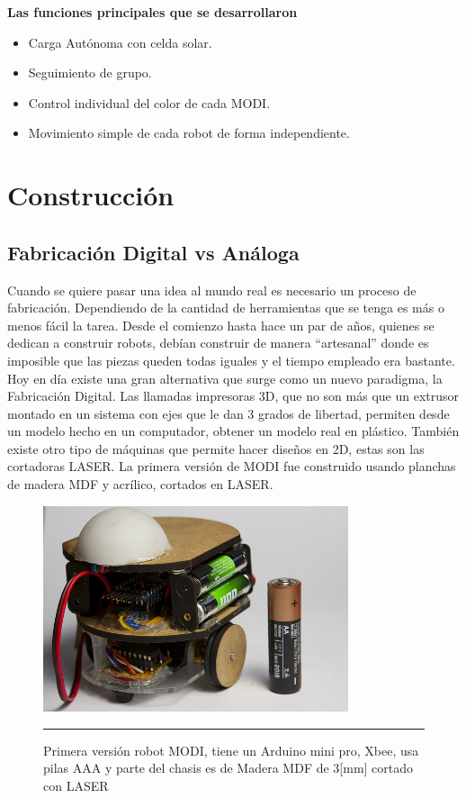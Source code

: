 \textbf{Las funciones principales que se desarrollaron}

\begin{itemize}
\item Carga Autónoma con celda solar.
\item Seguimiento de grupo.
\item Control individual del color de cada MODI.
\item Movimiento simple de cada robot de forma independiente.
\end{itemize}


\section{Construcción}

\subsection{Fabricación Digital vs Análoga}
Cuando se quiere pasar una idea al mundo real es necesario un proceso de fabricación. Dependiendo de la cantidad de herramientas que se tenga es más o menos fácil la tarea. Desde el comienzo hasta hace un par de años, quienes se dedican a construir robots, debían construir de manera “artesanal” donde es imposible que las piezas queden todas iguales y el tiempo empleado era bastante. Hoy en día existe una gran alternativa que surge como un nuevo paradigma, la Fabricación Digital. Las llamadas impresoras 3D, que no son más que un extrusor montado en un sistema con ejes que le dan 3 grados de libertad, permiten desde un modelo hecho en un computador, obtener un modelo real en plástico. También existe otro tipo de máquinas que permite hacer diseños en 2D, estas son las cortadoras LASER. La primera versión de MODI fue construido usando planchas de madera MDF y acrílico, cortados en LASER.

\begin{figure}[htbp]
	\centering
		\includegraphics[width=0.8\textwidth]{./Pictures/MODIrev1.jpg}
		\rule{35em}{0.5pt}
	\caption[modi]{Primera versión robot MODI, tiene un Arduino mini pro, Xbee, usa pilas AAA y parte del chasis es de Madera MDF de 3[mm] cortado con LASER}
	\label{fig:modi}
\end{figure}

